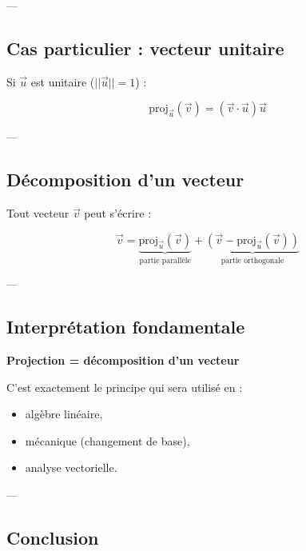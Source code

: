 \documentclass[11pt,a4paper]{article}
\begin{document}
---

\subsection{Cas particulier : vecteur unitaire}

Si $\vec{u}$ est unitaire ($||\vec{u}|| = 1$) :

\[
\boxed{
\text{proj}_{\vec{u}}(\vec{v}) = (\vec{v} \cdot \vec{u}) \vec{u}
}
\]

---

\subsection{Décomposition d’un vecteur}

Tout vecteur $\vec{v}$ peut s’écrire :

\[
\vec{v} =
\underbrace{\text{proj}_{\vec{u}}(\vec{v})}_{\text{partie parallèle}}
+
\underbrace{\left(\vec{v} - \text{proj}_{\vec{u}}(\vec{v})\right)}_{\text{partie orthogonale}}
\]

---

\subsection{Interprétation fondamentale}

\begin{center}
\textbf{Projection = décomposition d’un vecteur}
\end{center}

\bigskip

C’est exactement le principe qui sera utilisé en :

\begin{itemize}
\item algèbre linéaire,
\item mécanique (changement de base),
\item analyse vectorielle.
\end{itemize}

---

\subsection{Conclusion}
\end{document}
